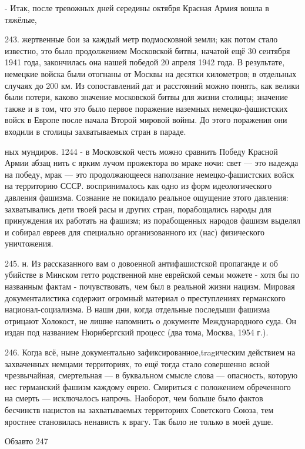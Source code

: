 - Итак, после тревожных дней середины октября Красная Армия вошла в тяжёлые,

243. жертвенные бои за каждый метр подмосковной земли; как потом стало известно, это было продолжением Московской битвы, начатой ещё 30 сентября 1941 года, закончилась она нашей победой 20 апреля 1942 года. В результате, немецкие войска были отогнаны от Москвы на десятки километров; в отдельных случаях до 200 км. Из сопоставлений дат и расстояний можно понять, как велики были потери, каково значение московской битвы для жизни столицы; значение также и в том, что это было первое поражение наземных немецко-фашистских войск в Европе после начала Второй мировой войны. До этого поражения они входили в столицы захватываемых стран в параде.

ных мундиров. 1244 - в Московской честь можно сравнить Победу Красной Армии абзац нить с ярким лучом прожектора во мраке ночи: свет — это надежда на победу, мрак — это продолжающееся наползание немецко-фашистских войск на территорию СССР. воспринималось как одно из форм идеологического давления фашизма. Сознание не покидало реальное ощущение этого давления: захватывались дети твоей расы и других стран, порабощались народы для принуждения их работать на фашизм; из порабощенных народов фашизм выделял и собирал евреев для специально организованного их (нас) физического уничтожения.

245. н.
Из рассказанного вам о довоенной антифашистской пропаганде и об убийстве в Минском гетто родственной мне еврейской семьи можете - хотя бы по названным фактам - почувствовать, чем был в реальной жизни нацизм. Мировая документалистика содержит огромный материал о преступлениях германского национал-социализма.
В наши дни, когда отдельные последыши фашизма отрицают Холокост, не лишне напомнить о документе Международного суда. Он издан под названием Нюрнбергский процесс (два тома, Москва, 1954 г.).

246.
Когда всё, ныне документально зафиксированное,tragическим действием на захваченных немцами территориях, то ещё тогда стало совершенно ясной чрезвычайная, смертельная — в буквальном смысле слова — опасность, которую нес германский фашизм каждому еврею.
Смириться с положением обреченного на смерть — исключалось напрочь. Наоборот, чем больше было фактов бесчинств нацистов на захватываемых территориях Советского Союза, тем яростнее становилась ненависть к врагу. Так было не только в моей душе.

Обзавто 247

